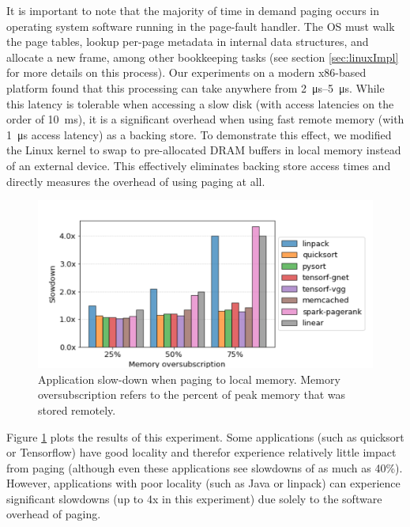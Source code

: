 It is important to note that the majority of time in demand paging occurs in
operating system software running in the page-fault handler. The OS must walk
the page tables, lookup per-page metadata in internal data structures, and
allocate a new frame, among other \gls{bookkeeping} tasks (see section
\ref{sec:linuxImpl} for more details on this process). Our experiments on a
modern x86-based platform found that this processing can take anywhere from
\SIrange{2}{5}{\micro\second}. While this latency is tolerable when accessing a
slow disk (with access latencies on the order of \SI{10}{\milli\second}), it is
a significant overhead when using fast remote memory (with
\SI{1}{\micro\second} access latency) as a backing store. To demonstrate this
effect, we modified the Linux kernel to swap to pre-allocated DRAM buffers in
local memory instead of an external device.  This effectively eliminates
backing store access times and directly measures the overhead of using paging
at all.

\begin{figure}[h]
    \centering
    \includegraphics[width=0.9\columnwidth]{figs/paging_overhead.png}
    \vspace{-5mm}
    \caption{Application slow-down when paging to local memory. Memory
oversubscription refers to the percent of peak memory that was stored remotely.}
    \label{fig:paging_overhead}
\end{figure}

Figure \ref{fig:paging_overhead} plots the results of this experiment. Some
applications (such as quicksort or Tensorflow) have good locality and therefor
experience relatively little impact from paging (although even these
applications see slowdowns of as much as 40\%). However, applications with
poor locality (such as Java or linpack) can experience significant slowdowns
(up to 4x in this experiment) due solely to the software overhead of paging. 

